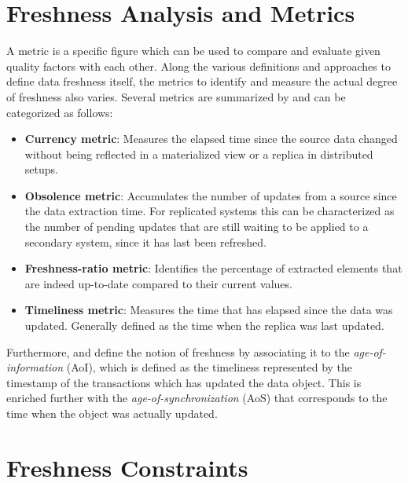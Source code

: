 \section{Freshness Analysis and Metrics}
\label{r:freshness_metrics}
A metric is a specific figure which can be used to compare and evaluate given quality factors with each other.
Along the various definitions and approaches to define data freshness itself, the metrics to identify and measure the actual degree of freshness also varies.
Several metrics are summarized by \cite{cho:2000, pacitti:2000, peralta:2006} and can be categorized as follows:
\begin{itemize}
    \item \textbf{Currency metric}: Measures the elapsed time since the source data changed without being reflected in a materialized view or a replica in distributed setups.
    \item \textbf{Obsolence metric}: Accumulates the number of updates from a source since the data extraction time. For replicated systems this can be characterized as the 
    number of pending updates that are still waiting to be applied to a secondary system, since it has last been refreshed.
    \item \textbf{Freshness-ratio metric}: Identifies the percentage of extracted elements that are indeed up-to-date compared to their current values.
    \item \textbf{Timeliness metric}: Measures the time that has elapsed since the data was updated. Generally defined as the time when the replica was last updated.
\end{itemize}


Furthermore, \cite{bedewy:2016} and \cite{zhong:2018} define the notion of freshness by associating it to the \emph{age-of-information} (AoI),
which is defined as the timeliness represented by the timestamp of the transactions which has updated the data object. 
This is enriched further with the \emph{age-of-synchronization} (AoS) that corresponds to the time when the object was actually updated.




\section{Freshness Constraints}
\label{r:express_freshness}

